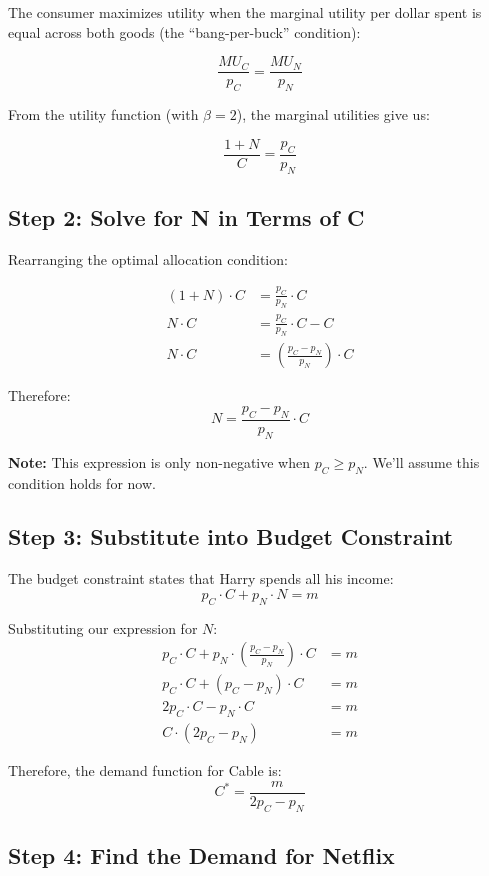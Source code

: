 \documentclass[11pt,a4paper]{article}
\begin{document}
The consumer maximizes utility when the marginal utility per dollar spent is equal across both goods (the ``bang-per-buck'' condition):

\[
\frac{MU_C}{p_C} = \frac{MU_N}{p_N}
\]

From the utility function (with $\beta = 2$), the marginal utilities give us:

\[
\frac{1 + N}{C} = \frac{p_C}{p_N}
\]

\subsection{Step 2: Solve for N in Terms of C}

Rearranging the optimal allocation condition:

\begin{align*}
(1 + N) \cdot C &= \frac{p_C}{p_N} \cdot C \\
N \cdot C &= \frac{p_C}{p_N} \cdot C - C \\
N \cdot C &= \left(\frac{p_C - p_N}{p_N}\right) \cdot C
\end{align*}

Therefore:
\[
N = \frac{p_C - p_N}{p_N} \cdot C
\]

\textbf{Note:} This expression is only non-negative when $p_C \geq p_N$. We'll assume this condition holds for now.

\subsection{Step 3: Substitute into Budget Constraint}

The budget constraint states that Harry spends all his income:
\[
p_C \cdot C + p_N \cdot N = m
\]

Substituting our expression for $N$:
\begin{align*}
p_C \cdot C + p_N \cdot \left(\frac{p_C - p_N}{p_N}\right) \cdot C &= m \\
p_C \cdot C + (p_C - p_N) \cdot C &= m \\
2p_C \cdot C - p_N \cdot C &= m \\
C \cdot (2p_C - p_N) &= m
\end{align*}

Therefore, the demand function for Cable is:
\[
\boxed{C^* = \frac{m}{2p_C - p_N}}
\]

\subsection{Step 4: Find the Demand for Netflix}
\end{document}
